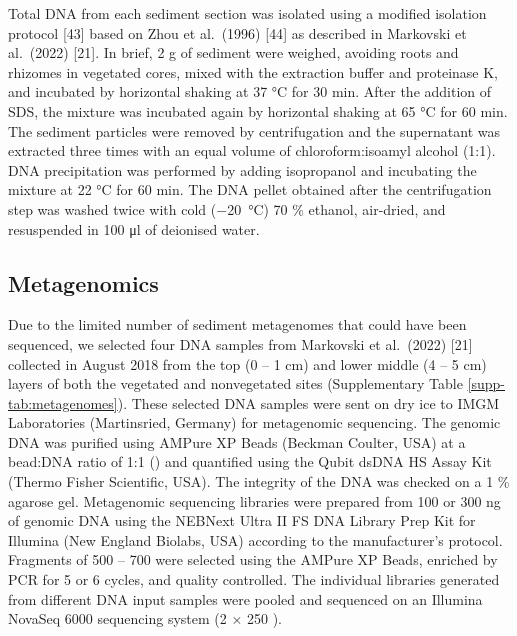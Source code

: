 \documentclass[
  12 pt,
]{article}
\begin{document}
Total DNA from each sediment section was isolated using a modified isolation protocol {[}43{]} based on Zhou et al.~(1996) {[}44{]} as described in Markovski et al.~(2022) {[}21{]}. In brief, 2 \si{\gram} of sediment were weighed, avoiding roots and rhizomes in vegetated cores, mixed with the extraction buffer and proteinase K, and incubated by horizontal shaking at 37 \si{\degreeCelsius} for 30 \si{\minute}. After the addition of SDS, the mixture was incubated again by horizontal shaking at 65 \si{\degreeCelsius} for 60 \si{\minute}. The sediment particles were removed by centrifugation and the supernatant was extracted three times with an equal volume of chloroform:isoamyl alcohol (1:1). DNA precipitation was performed by adding isopropanol and incubating the mixture at 22 \si{\degreeCelsius} for 60 \si{\minute}. The DNA pellet obtained after the centrifugation step was washed twice with cold (\SI{-20}{\degreeCelsius}) 70 \si{\percent} ethanol, air-dried, and resuspended in 100 \si{\ul} of deionised water.

\hypertarget{metagenomics}{%
\subsection{Metagenomics}\label{metagenomics}}

Due to the limited number of sediment metagenomes that could have been sequenced, we selected four DNA samples from Markovski et al.~(2022) {[}21{]} collected in August 2018 from the top (0 -- 1 cm) and lower middle (4 -- 5 cm) layers of both the vegetated and nonvegetated sites (Supplementary Table \ref{supp-tab:metagenomes}). These selected DNA samples were sent on dry ice to IMGM Laboratories (Martinsried, Germany) for metagenomic sequencing. The genomic DNA was purified using AMPure XP Beads (Beckman Coulter, USA) at a bead:DNA ratio of 1:1 (\si{\vV}) and quantified using the Qubit dsDNA HS Assay Kit (Thermo Fisher Scientific, USA). The integrity of the DNA was checked on a 1 \si{\percent} agarose gel. Metagenomic sequencing libraries were prepared from 100 or 300 \si{\nano\gram} of genomic DNA using the NEBNext Ultra II FS DNA Library Prep Kit for Illumina (New England Biolabs, USA) according to the manufacturer's protocol. Fragments of 500 -- 700 \si{\bp} were selected using the AMPure XP Beads, enriched by PCR for 5 or 6 cycles, and quality controlled. The individual libraries generated from different DNA input samples were pooled and sequenced on an Illumina NovaSeq 6000 sequencing system (2 × 250 \si{\bp}).
\end{document}
